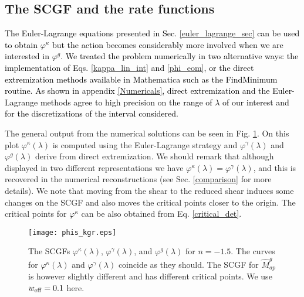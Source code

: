 \documentclass[twocolumn,aps,reprint, nofootinbib]{revtex4}
\newcommand{\eff}{{\rm eff}}
\newcommand{\w}{{w_{\eff}}}
\newcommand{\Map}{\hat{M}_{ap}}
\newcommand{\Mapg}{\hat{M}_{ap}^g}
\newcommand{\varphik}{\varphi^{\kappa}}
\newcommand{\varphig}{\varphi^{\gamma}}
\newcommand{\varphir}{\varphi^{g}}
\newcommand{\fb}[1]{{\textcolor{red}{#1}}}
\newcommand{\pr}[1]{{\textcolor{black}{\textit{} #1}}}
\begin{document}
\subsection{The SCGF and the rate functions}
\pr{The Euler-Lagrange equations presented in Sec. \ref{euler_lagrange_sec} can be used to obtain $\varphik$ but the action becomes considerably more involved when we are interested in $\varphir$. We treated the problem numerically in two alternative ways: the implementation of Eqs. \eqref{kappa_lin_int} and \eqref{phi_eom}, or the direct extremization methods available in Mathematica \cite{math} such as the FindMinimum routine. As shown in appendix \ref{Numericals}, direct extremization and the Euler-Lagrange methods agree to high precision on the range of $\lambda$ of our interest and for the discretizations of the interval considered.}

The general output from the numerical solutions can be seen in Fig. \ref{three_phis}. On this plot $\varphik(\lambda)$ is computed using the Euler-Lagrange strategy and $\varphig(\lambda)$ and $\varphir(\lambda)$ derive from direct extremization. We should remark that although displayed in two different representations we have $\varphik(\lambda) = \varphig(\lambda)$, and this is recovered in the numerical reconstructions (see Sec. \ref{comparison} for more details). We note that moving from the shear to the reduced shear induces some changes on the SCGF and also moves the critical points closer to the origin. The critical points for $\varphik$ can be also obtained from Eq. \eqref{critical_det}.

\begin{figure}[!ht]
\centering
\texttt{[image: phis\_kgr.eps]}
\caption{The SCGFs $\varphik(\lambda)$, $\varphig(\lambda)$, and $\varphir(\lambda)$ for $n=-1.5$. The curves for $\varphik(\lambda)$ and $\varphig(\lambda)$ coincide as they should. The SCGF for $\Mapg$ is however slightly different and has different critical points. We use $\w=0.1$ here.}
\label{three_phis}
\end{figure}

\end{document}
